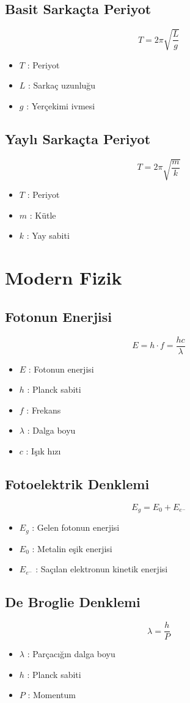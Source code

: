 \documentclass[a4paper, 11pt, titlepage]{article}
\begin{document}
\subsection{Basit Sarkaçta Periyot}
\[
T = 2\pi \sqrt{\frac{L}{g}}
\]
\begin{itemize}
  \item $T$ : Periyot
  \item $L$ : Sarkaç uzunluğu
  \item $g$ : Yerçekimi ivmesi
\end{itemize}


\subsection{Yaylı Sarkaçta Periyot}
\[
T = 2\pi \sqrt{\frac{m}{k}}
\]
\begin{itemize}
  \item $T$ : Periyot
  \item $m$ : Kütle
  \item $k$ : Yay sabiti
\end{itemize}
\section{Modern Fizik}
\subsection{Fotonun Enerjisi}
\[
E = h \cdot f = \frac{h c}{\lambda}
\]
\begin{itemize}
  \item $E$ : Fotonun enerjisi
  \item $h$ : Planck sabiti
  \item $f$ : Frekans
  \item $\lambda$ : Dalga boyu
  \item $c$ : Işık hızı
\end{itemize}

\subsection{Fotoelektrik Denklemi}
\[
E_g = E_0 + E_{e^-}
\]
\begin{itemize}
  \item $E_g$ : Gelen fotonun enerjisi
  \item $E_0$ : Metalin eşik enerjisi
  \item $E_{e^-}$ : Saçılan elektronun kinetik enerjisi
\end{itemize}

\subsection{De Broglie Denklemi}
\[
\lambda = \frac{h}{P}
\]
\begin{itemize}
  \item $\lambda$ : Parçacığın dalga boyu
  \item $h$ : Planck sabiti
  \item $P$ : Momentum
\end{itemize}
\end{document}
